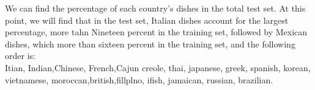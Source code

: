 \documentclass{tikzposter} %
\begin{document}
\begin{columns}
{%
		
\begin{description}
  	\item
    We can find the percentage of each country’s dishes in the total test set. 
    At this point, we will find that in the test set, Italian dishes account for 
    the largest percentage, more tahn Nineteen percent in the training set, 
    followed by Mexican dishes, which more than sixteen percent in the training set, 
    and the following order is: \\
    Itian, Indian,Chinese, French,Cajun creole, thai, 
    japanese, greek, spanish, korean, vietnamese, moroccan,british,fillplno, ifish, jamaican,
    russian, brazilian.
\end{description}

}



\end{columns}
\end{document}
